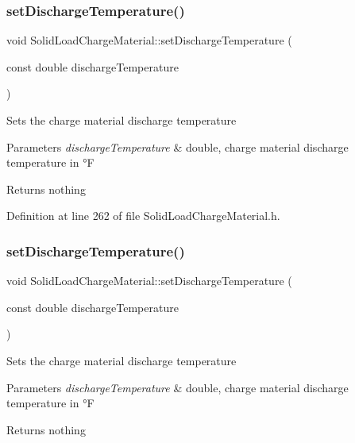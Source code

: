 \subsubsection{\texorpdfstring{set\+Discharge\+Temperature()}{setDischargeTemperature()}\hspace{0.1cm}{\footnotesize\ttfamily [2/3]}}
{\footnotesize\ttfamily void Solid\+Load\+Charge\+Material\+::set\+Discharge\+Temperature (\begin{DoxyParamCaption}\item[{const double}]{discharge\+Temperature }\end{DoxyParamCaption})\hspace{0.3cm}{\ttfamily [inline]}}

Sets the charge material discharge temperature 
\begin{DoxyParams}{Parameters}
{\em discharge\+Temperature} & double, charge material discharge temperature in °F \\
\hline
\end{DoxyParams}
\begin{DoxyReturn}{Returns}
nothing 
\end{DoxyReturn}


Definition at line 262 of file Solid\+Load\+Charge\+Material.\+h.

\mbox{\label{class_solid_load_charge_material_adf73bc8d656a501cae5ad68af7a7c4fb}} 
\subsubsection{\texorpdfstring{set\+Discharge\+Temperature()}{setDischargeTemperature()}\hspace{0.1cm}{\footnotesize\ttfamily [3/3]}}
{\footnotesize\ttfamily void Solid\+Load\+Charge\+Material\+::set\+Discharge\+Temperature (\begin{DoxyParamCaption}\item[{const double}]{discharge\+Temperature }\end{DoxyParamCaption})\hspace{0.3cm}{\ttfamily [inline]}}

Sets the charge material discharge temperature 
\begin{DoxyParams}{Parameters}
{\em discharge\+Temperature} & double, charge material discharge temperature in °F \\
\hline
\end{DoxyParams}
\begin{DoxyReturn}{Returns}
nothing 
\end{DoxyReturn}


